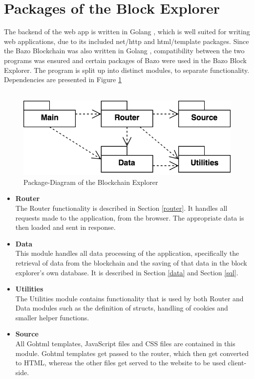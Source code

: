 \section{Packages of the Block Explorer}
The backend of the web app is written in Golang \cite{golang}, which is well suited for writing web applications, due to its included net/http \cite{httppackage} and html/template \cite{template} packages. Since the Bazo Blockchain was also written in Golang \cite{bazo}, compatibility between the two programs was ensured and certain packages of Bazo were used in the Bazo Block Explorer. The program is split up into distinct modules, to separate functionality. Dependencies are presented in Figure \ref{fig:packages} \\ \\

\begin{figure}[h]
  \includegraphics[scale=0.4]{packagesnew.png}
  \centering
  \caption{Package-Diagram of the Blockchain Explorer}
  \label{fig:packages}
\end{figure}

\begin{itemize}
\item \textbf{Router}\\
The Router functionality is described in Section \ref{router}. It handles all requests made to the application, from the browser. The appropriate data is then loaded and sent in response.
\item \textbf{Data}\\
This module handles all data processing of the application, specifically the retrieval of data from the blockchain and the saving of that data in the block explorer's own database. It is described in Section \ref{data} and Section \ref{sql}.
\item \textbf{Utilities}\\
The Utilities module contains functionality that is used by both Router and Data modules such as the definition of structs, handling of cookies and smaller helper functions.
\item \textbf{Source}\\
All Gohtml templates, JavaScript files and CSS files are contained in this module. Gohtml templates get passed to the router, which then get converted to HTML, whereas the other files get served to the website to be used client-side.
\end{itemize}

